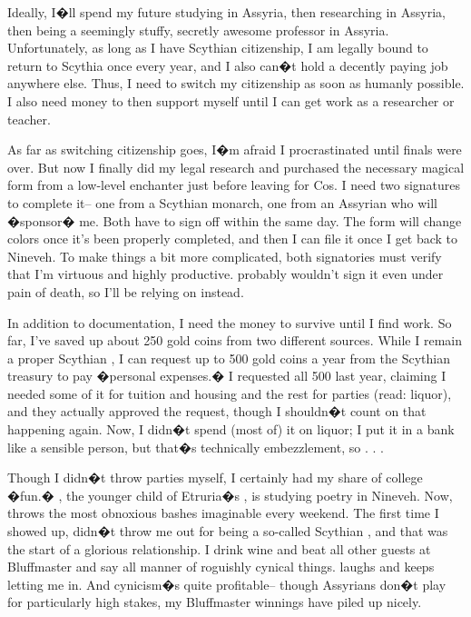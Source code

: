\documentclass[char]{Kos}
\begin{document}
Ideally, I�ll spend my future studying in Assyria, then researching in Assyria, then being a seemingly stuffy, secretly awesome professor in Assyria. Unfortunately, as long as I have Scythian citizenship, I am legally bound to return to Scythia once every year, and I also can�t hold a decently paying job anywhere else. Thus, I need to switch my citizenship as soon as humanly possible. I also need money to then support myself until I can get work as a researcher or teacher.

As far as switching citizenship goes, I�m afraid I procrastinated until finals were over. But now I finally did my legal research and purchased the necessary magical form from a low-level enchanter just before leaving for Cos. I need two signatures to complete it-- one from a Scythian monarch, one from an Assyrian who will �sponsor� me. Both have to sign off within the same day. The form will change colors once it's been properly completed, and then I can file it once I get back to Nineveh. To make things a bit more complicated, both signatories must verify that I'm virtuous and highly productive. \cScythiaQueen{\Monarch} \cScythiaQueen{\nickname} probably wouldn't sign it even under pain of death, so I'll be relying on \cScythiaKing{\nickname} instead.

In addition to documentation, I need the money to survive until I find work. So far, I've saved up about 250 gold coins from two different sources. While I remain a proper Scythian \cWard{\prince}, I can request up to 500 gold coins a year from the Scythian treasury to pay �personal expenses.� I requested all 500 last year, claiming I needed some of it for tuition and housing and the rest for parties (read: liquor), and they actually approved the request, though I shouldn�t count on that happening again. Now, I didn�t spend (most of) it on liquor; I put it in a bank like a sensible person, but that�s technically embezzlement, so . . . 

Though I didn�t throw parties myself, I certainly had my share of college �fun.� \cPoet{\Prince} \cPoet{\name}, the younger child of Etruria�s \cEtruriaKing{\Monarch} \cEtruriaKing{\name}, is studying poetry in Nineveh. Now, \cPoet{\they} throws the most obnoxious bashes imaginable every weekend. The first time I showed up, \cPoet{\they} didn�t throw me out for being a so-called Scythian \cWard{\prince}, and that was the start of a glorious relationship. I drink \cPoet{\their} wine and beat all \cPoet{\their} other guests at Bluffmaster and say all manner of roguishly cynical things. \cPoet{\They} laughs and keeps letting me in. And cynicism�s quite profitable-- though Assyrians don�t play for particularly high stakes, my Bluffmaster winnings have piled up nicely.
\end{document}
